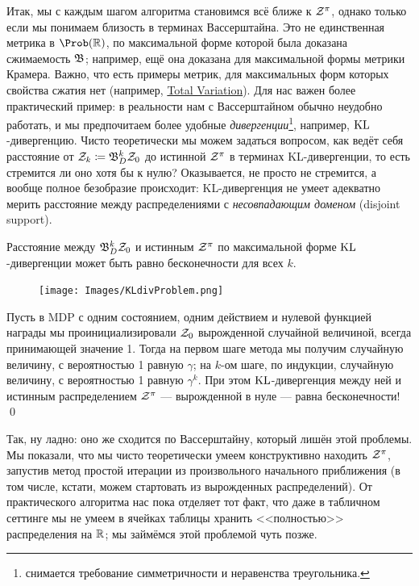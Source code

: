 Итак, мы с каждым шагом алгоритма становимся всё ближе к $\mathcal{Z}^\pi$, однако только если мы понимаем близость в терминах Вассерштайна. Это не единственная метрика в $\Prob ( \R )$, по максимальной форме которой была доказана сжимаемость $\mathfrak{B}$; например, ещё она доказана для максимальной формы метрики Крамера. Важно, что есть примеры метрик, для максимальных форм которых свойства сжатия нет (например, \href{https://en.wikipedia.org/wiki/Total_variation_distance_of_probability_measures}{Total Variation}). Для нас важен более практический пример: в реальности нам с Вассерштайном обычно неудобно работать, и мы предпочитаем более удобные \emph{дивергенции}\footnote{снимается требование симметричности и неравенства треугольника.}, например, $\operatorname{KL}$-дивергенцию. Чисто теоретически мы можем задаться вопросом, как ведёт себя расстояние от $\Z_k \HM\coloneqq \B_D^k \Z_0$ до истинной $\mathcal{Z}^{\pi}$ в терминах KL-дивергенции, то есть стремится ли оно хотя бы к нулю? Оказывается, не просто не стремится, а вообще полное безобразие происходит: KL-дивергенция не умеет адекватно мерить расстояние между распределениями с \emph{несовпадающим доменом} (disjoint support).

\begin{theorem}
Расстояние между $\mathfrak{B}_D^k \mathcal{Z}_0$ и истинным $\mathcal{Z}^\pi$ по максимальной форме $\operatorname{KL}$-дивергенции может быть равно бесконечности для всех $k$.

\begin{figure}
\vspace{-1cm}
\centering
\texttt{[image: Images/KLdivProblem.png]}
\vspace{-0.5cm}
\end{figure}
\beginproof[Пример]
Пусть в MDP с одним состоянием, одним действием и нулевой функцией награды мы проинициализировали $\mathcal{Z}_0$ вырожденной случайной величиной, всегда принимающей значение 1. Тогда на первом шаге метода мы получим случайную величину, с вероятностью 1 равную $\gamma$; на $k$-ом шаге, по индукции, случайную величину, с вероятностью 1 равную $\gamma^k$. При этом $\operatorname{KL}$-дивергенция между ней и истинным распределением $\mathcal{Z}^\pi$ --- вырожденной в нуле --- равна бесконечности! \qed
\end{theorem}

Так, ну ладно: оно же сходится по Вассерштайну, который лишён этой проблемы. Мы показали, что мы чисто теоретически умеем конструктивно находить $\mathcal{Z}^{\pi}$, запустив метод простой итерации из произвольного начального приближения (в том числе, кстати, можем стартовать из вырожденных распределений). От практического алгоритма нас пока отделяет тот факт, что даже в табличном сеттинге мы не умеем в ячейках таблицы хранить <<полностью>> распределения на $\mathbb{R}$; мы займёмся этой проблемой чуть позже.

